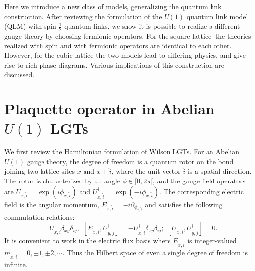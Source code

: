 \documentclass[a4paper,11pt]{article}
\begin{document}
 Here we introduce a new class of models, generalizing the quantum link construction. After reviewing 
the formulation of the $U(1)$ quantum link model (QLM) with spin-$\frac{1}{2}$ quantum links, we show it is 
possible to realize a different gauge theory by choosing fermionic operators. For the square lattice, the 
theories realized with spin and with fermionic operators are identical to each other. However, for the cubic 
lattice the two models lead to differing physics, and give rise to rich phase diagrams. Various implications of this
construction are discussed.

\section{Plaquette operator in Abelian $U(1)$ LGTs}
 We first review the Hamiltonian formulation of Wilson LGTs. For an Abelian $U(1)$ gauge theory, the degree 
of freedom is a quantum rotor on the bond joining two lattice sites $x$ and $x+\hat{i}$, where the unit vector
$\hat{i}$ is a spatial direction. The rotor is characterized by an angle $\phi \in [0, 2 \pi[$, and the gauge 
field operators are $U_{x,\hat{i}} = \exp(i \phi_{x,\hat{i}})$ and 
$U_{x,\hat{i}}^\dagger = \exp(-i  \phi_{x,\hat{i}})$. 
The corresponding electric field is the angular momentum, $E_{x,\hat{i}} = -i\partial_{\phi_{x,\hat{i}}}$
and satisfies the following commutation relations:
\begin{equation}
 [E_{x,\hat{i}}, U_{y,\hat{j}}] = U_{x,\hat{i}} \delta_{xy} \delta_{ij},~~
 [E_{x,\hat{i}}, U_{y,\hat{j}}^\dagger] = -U_{x,\hat{i}}^\dagger \delta_{xy} \delta_{ij};~~
 [U_{x,\hat{i}}, U_{y,\hat{j}}^\dagger] = 0.
\label{eq:Comm}
\end{equation}
 It is convenient to work in the electric flux basis where $E_{x,\hat{i}}$ is integer-valued 
 $m_{x,\hat{i}} = 0, \pm 1, \pm 2, \cdots$. Thus the Hilbert space of even a single degree of freedom is infinite. 
\end{document}
